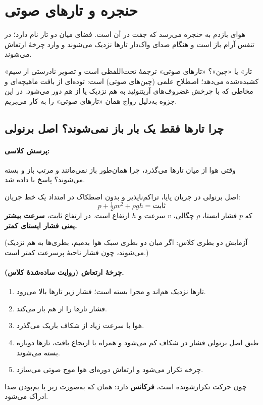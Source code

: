 \section{حنجره و تارهای صوتی}

هوای بازدم به حنجره می‌رسد که جفت  در آن است. فضای میان دو تار  نام دارد؛ در تنفس آرام باز است و هنگام صدای واک‌دار تارها نزدیک می‌شوند و وارد چرخهٔ ارتعاش می‌شوند.

\begin{correctionbox}{«تار» یا «چین»؟}
«تارهای صوتی» ترجمهٔ تحت‌اللفظی  است و تصویر نادرستی از سیم کشیده‌شده می‌دهد؛ اصطلاح علمی  (چین‌های صوتی) است: توده‌ای از بافت ماهیچه‌ای و مخاطی که با چرخش غضروف‌های آریتنوئید به هم نزدیک یا از هم دور می‌شود. در این جزوه به‌دلیل رواج همان «تارهای صوتی» را به کار می‌بریم.
\end{correctionbox}

\subsection{چرا تارها فقط یک بار باز نمی‌شوند؟ اصل برنولی}
\paragraph{پرسش کلاسی:} وقتی هوا از میان تارها می‌گذرد، چرا همان‌طور باز نمی‌مانند و مرتب باز و بسته می‌شوند؟ پاسخ با  داده شد.

\begin{definitionbox}{اصل برنولی}
در جریان پایا، تراکم‌ناپذیر و بدون اصطکاک در امتداد یک خط جریان:
\[
p + \tfrac{1}{2}\rho v^2 + \rho g h = \text{ثابت}
\]
که $p$ فشار ایستا، $\rho$ چگالی، $v$ سرعت و $h$ ارتفاع است. در ارتفاع ثابت، \textbf{سرعت بیشتر یعنی فشار ایستای کمتر.}
\end{definitionbox}

(آزمایش دو بطری کلاس: اگر میان دو بطری سبک هوا بدمیم، بطری‌ها به هم نزدیک می‌شوند، چون فشار ناحیهٔ پرسرعت کمتر است.)

\paragraph{چرخهٔ ارتعاش (روایت ساده‌شدهٔ کلاس).}
\begin{enumerate}
  \item تارها نزدیک هم‌اند و مجرا بسته است؛ فشار زیر تارها بالا می‌رود.
  \item فشار تارها را از هم باز می‌کند.
  \item هوا با سرعت زیاد از شکاف باریک می‌گذرد.
  \item طبق اصل برنولی فشار در شکاف کم می‌شود و همراه با ارتجاع بافت، تارها دوباره بسته می‌شوند.
  \item چرخه تکرار می‌شود و ارتعاش دوره‌ای هوا موج صوتی می‌سازد.
\end{enumerate}
چون حرکت تکرارشونده است، \textbf{فرکانس} دارد: همان  که به‌صورت زیر یا بم‌بودن صدا ادراک می‌شود.

